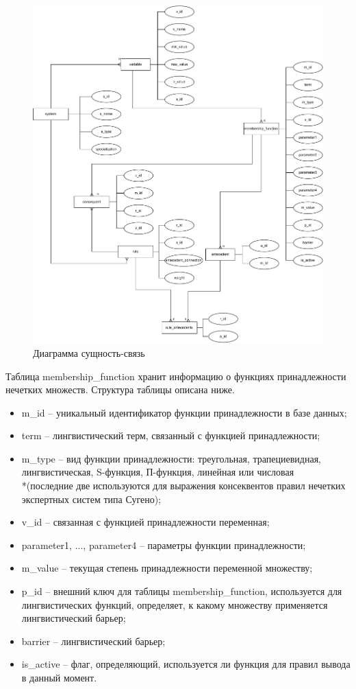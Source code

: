 \begin{figure}[H]
	\centering
	\includegraphics[width=1\linewidth]{img/FuzzySystemDatabaseDiagram}
	\caption{Диаграмма сущность-связь}
	\label{fig:fuzzysystemdatabasediagram}
\end{figure}

Таблица membership\_function хранит информацию о функциях принадлежности нечетких множеств. Структура таблицы описана ниже.
\begin{itemize}
	\item m\_id -- уникальный идентификатор функции принадлежности в базе данных;
	\item term -- лингвистический терм, связанный с функцией принадлежности;
	\item m\_type -- вид функции принадлежности: треугольная, трапециевидная, лингвистическая, S-функция, П-функция, линейная или числовая \\*(последние две используются для выражения консеквентов правил нечетких экспертных систем типа Сугено);
	\item v\_id -- связанная с функцией принадлежности переменная;
	\item parameter1, ..., parameter4 -- параметры функции принадлежности;
	\item m\_value -- текущая степень принадлежности переменной множеству;
	\item p\_id -- внешний ключ для таблицы membership\_function, используется для лингвистических функций, определяет, к какому множеству применяется лингвистический барьер;
	\item barrier -- лингвистический барьер;
	\item is\_active -- флаг, определяющий, используется ли функция для правил вывода в данный момент.
\end{itemize}

